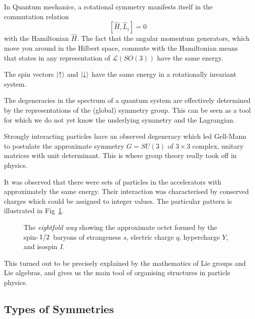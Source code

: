In Quantum mechanics, a rotational symmetry manifests itself in the commutation relation
\begin{equation}
  \left[ \hat{H}, \hat L_i \right] = 0
\end{equation}
with the Hamiltonian $\hat H$. The fact that the angular momentum generators, which move you around in the Hilbert space, commute with the Hamiltonian means that states in any representation of $\mathscr{L}(SO(3))$ have the same energy.

\begin{example}[]
The spin vectors $\ket{\uparrow}$ and $\ket{\downarrow}$ have the same energy in a rotationally invariant system.
\end{example}

The degeneracies in the spectrum of a quantum system are effectively determined by the representations of the (global) symmetry group.
This can be seen as a tool for which we do not yet know the underlying symmetry and the Lagrangian.

\begin{example}
Strongly interacting particles have an observed degeneracy which led Gell-Mann to postulate the approximate symmetry $G = SU(3)$ of $3\times 3$ complex, unitary matrices with unit determinant.
This is where group theory really took off in physics.

It was observed that there were sets of particles in the accelerators with approximately the same energy. Their interaction was characterised by conserved charges which could be assigned to integer values.  The particular pattern is illustrated in Fig~\ref{fig:eightfold}.

\begin{figure}[htpb]
  \centering
  \def\svgwidth{0.7\columnwidth}
  
  \caption{The \emph{eightfold way} showing the approximate octet formed by the spin-$\flatfrac{1}{2}$ baryons of strangeness $s$, electric charge $q$, hypercharge $Y$, and isospin $I$.}
  \label{fig:eightfold}
\end{figure}
This turned out to be precisely explained by the mathematics of Lie groups and Lie algebras, and gives us the main tool of organising structures in particle physics.
\end{example} 

\subsection{Types of Symmetries}%
\label{sub:types_of_symmetries}

